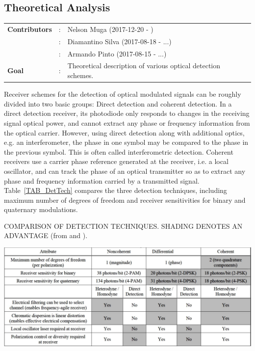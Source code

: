 \subsection{Theoretical Analysis} \label{subsec:intro}

\begin{tcolorbox}	
\begin{tabular}{p{2.75cm} p{0.2cm} p{10.5cm}}
\textbf{Contributors}  &:& Nelson Muga (2017-12-20 - )\\
                       &:& Diamantino Silva (2017-08-18 - ...)\\
                       &:& Armando Pinto (2017-08-15 - ...)\\
\textbf{Goal}          &:& Theoretical description of various optical detection schemes.\\
\end{tabular}
\end{tcolorbox}

Receiver schemes for the detection of optical modulated signals can be roughly divided into two basic groups: Direct detection and coherent detection.   In a direct detection receiver, its photodiode only responds to changes in the receiving signal optical power, and cannot extract any phase or frequency information from the optical carrier. However, using direct detection along with additional optics, e.g. an interferometer, the phase in one symbol may be compared to the phase in the previous symbol. This is often called interferometric detection. Coherent receivers use a carrier phase reference generated at the receiver, i.e. a local oscillator, and  can track the phase of an optical transmitter so as to extract any phase and frequency information carried by a transmitted signal. Table~\ref{TAB_DetTech} compares the three detection techniques, including maximum number of degrees of freedom and receiver sensitivities for binary and quaternary modulations.

\begin{table}[h]\caption{COMPARISON OF DETECTION TECHNIQUES. SHADING DENOTES AN ADVANTAGE (from \cite{Kahn2004} and \cite{Kahn2006}).}\label{TAB_DetTech}
\centering
\includegraphics[width=6in]{./sdf/optical_detection/figures/Detection-Techniques-Kahn.pdf}
\end{table}



